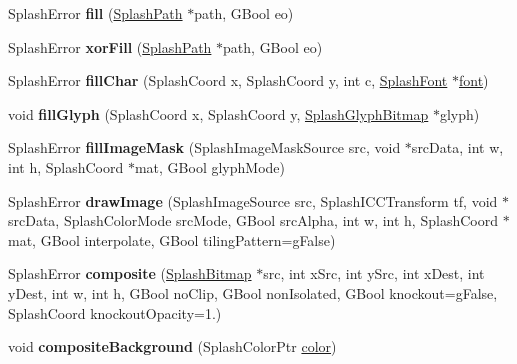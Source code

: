 \begin{DoxyCompactItemize}
Splash\+Error {\bfseries fill} (\hyperlink{class_splash_path}{Splash\+Path} $\ast$path, G\+Bool eo)
\item 
\mbox{\label{class_splash_a30431fcefd14e3859c20c000439bead8}} 
Splash\+Error {\bfseries xor\+Fill} (\hyperlink{class_splash_path}{Splash\+Path} $\ast$path, G\+Bool eo)
\item 
\mbox{\label{class_splash_a4b091ef40d4c853e701688957fb20178}} 
Splash\+Error {\bfseries fill\+Char} (Splash\+Coord x, Splash\+Coord y, int c, \hyperlink{class_splash_font}{Splash\+Font} $\ast$\hyperlink{structfont}{font})
\item 
\mbox{\label{class_splash_a0dcf2e4d60a6cef5bc47b2bf6d1a06a6}} 
void {\bfseries fill\+Glyph} (Splash\+Coord x, Splash\+Coord y, \hyperlink{struct_splash_glyph_bitmap}{Splash\+Glyph\+Bitmap} $\ast$glyph)
\item 
\mbox{\label{class_splash_acb530bbc336c4c4c8d4287b38f3ca700}} 
Splash\+Error {\bfseries fill\+Image\+Mask} (Splash\+Image\+Mask\+Source src, void $\ast$src\+Data, int w, int h, Splash\+Coord $\ast$mat, G\+Bool glyph\+Mode)
\item 
\mbox{\label{class_splash_a1142a76b1cc63d0b98c0c376607ced6a}} 
Splash\+Error {\bfseries draw\+Image} (Splash\+Image\+Source src, Splash\+I\+C\+C\+Transform tf, void $\ast$src\+Data, Splash\+Color\+Mode src\+Mode, G\+Bool src\+Alpha, int w, int h, Splash\+Coord $\ast$mat, G\+Bool interpolate, G\+Bool tiling\+Pattern=g\+False)
\item 
\mbox{\label{class_splash_acab7f46f2fbceaad04db0e1edfbba0a5}} 
Splash\+Error {\bfseries composite} (\hyperlink{class_splash_bitmap}{Splash\+Bitmap} $\ast$src, int x\+Src, int y\+Src, int x\+Dest, int y\+Dest, int w, int h, G\+Bool no\+Clip, G\+Bool non\+Isolated, G\+Bool knockout=g\+False, Splash\+Coord knockout\+Opacity=1.)
\item 
\mbox{\label{class_splash_adc56cfab29e8b0a0561483946a13836c}} 
void {\bfseries composite\+Background} (Splash\+Color\+Ptr \hyperlink{structcolor}{color})
\item 
\mbox{\label{class_splash_a42ed4fb1b6b8aca9b44c7d713c61d90f}} 

\end{DoxyCompactItemize}
